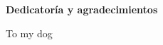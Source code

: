 \clearemptydoublepage
{}
{}

\vspace*{2cm}

\begin{center}
{\Large \textbf{Dedicatoría y agradecimientos}}
\end{center}

\vspace{1cm}

\begin{center}
To my dog
\end{center}
